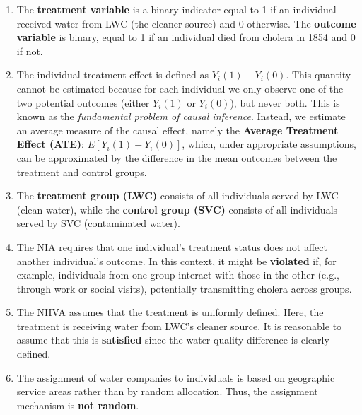 \documentclass[11pt]{exam}
\begin{document}
\begin{questions}
\begin{solution}[0cm]

    \begin{enumerate}[label=(\alph*)]
        \item The \textbf{treatment variable} is a binary indicator equal to 1 if an individual received water from LWC (the cleaner source) and 0 otherwise. The \textbf{outcome variable} is binary, equal to 1 if an individual died from cholera in 1854 and 0 if not.
        
        \item The individual treatment effect is defined as \(Y_i(1) - Y_i(0)\). This quantity cannot be estimated because for each individual we only observe one of the two potential outcomes (either \(Y_i(1)\) or \(Y_i(0)\)), but never both. This is known as the \emph{fundamental problem of causal inference}. Instead, we estimate an average measure of the causal effect, namely the \textbf{Average Treatment Effect (ATE)}: \(E[Y_i(1) - Y_i(0)]\), which, under appropriate assumptions, can be approximated by the difference in the mean outcomes between the treatment and control groups.
        
        \item The \textbf{treatment group (LWC)} consists of all individuals served by LWC (clean water), while the \textbf{control group (SVC)} consists of all individuals served by SVC (contaminated water).
        
        \item The NIA requires that one individual's treatment status does not affect another individual's outcome. In this context, it might be \textbf{violated} if, for example, individuals from one group interact with those in the other (e.g., through work or social visits), potentially transmitting cholera across groups.
        
        \item The NHVA assumes that the treatment is uniformly defined. Here, the treatment is receiving water from LWC’s cleaner source. It is reasonable to assume that this is \textbf{satisfied} since the water quality difference is clearly defined.
        
        \item The assignment of water companies to individuals is based on geographic service areas rather than by random allocation. Thus, the assignment mechanism is \textbf{not random}.
        

\end{enumerate}
\end{solution}
\end{questions}
\end{document}
